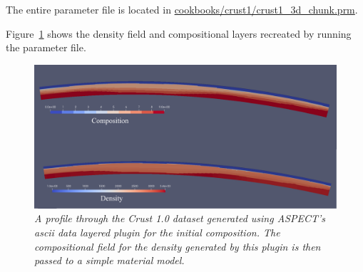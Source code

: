 The entire parameter file is located in
\url{cookbooks/crust1/crust1_3d_chunk.prm}.


Figure~\ref{fig:crust1} shows the density field and compositional layers
recreated by running the parameter file.

\begin{figure}
  \centering
  \includegraphics[height=0.25\textwidth]{cookbooks/crust1/doc/crust1_3d_chunk.png}
  \caption{\it A profile through the Crust 1.0 dataset generated using ASPECT's
  ascii data layered plugin for the initial composition. The compositional field
  for the density generated by this plugin is then passed to a simple material model.}
  \label{fig:crust1}
\end{figure}
